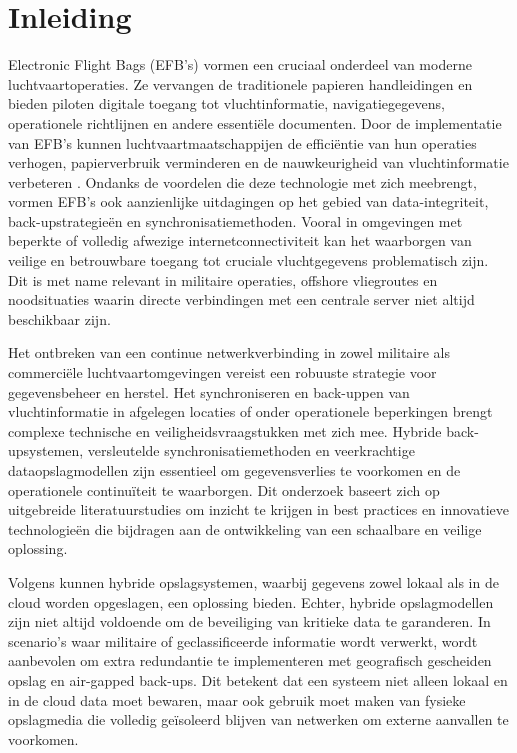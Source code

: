 \section{Inleiding}

Electronic Flight Bags (EFB’s) vormen een cruciaal onderdeel van moderne luchtvaartoperaties. Ze vervangen de traditionele papieren handleidingen en bieden piloten digitale toegang tot vluchtinformatie, navigatiegegevens, operationele richtlijnen en andere essentiële documenten. Door de implementatie van EFB’s kunnen luchtvaartmaatschappijen de efficiëntie van hun operaties verhogen, papierverbruik verminderen en de nauwkeurigheid van vluchtinformatie verbeteren \autocite{IFSAeroEFB, SkybraryEFB}. Ondanks de voordelen die deze technologie met zich meebrengt, vormen EFB’s ook aanzienlijke uitdagingen op het gebied van data-integriteit, back-upstrategieën en synchronisatiemethoden. Vooral in omgevingen met beperkte of volledig afwezige internetconnectiviteit kan het waarborgen van veilige en betrouwbare toegang tot cruciale vluchtgegevens problematisch zijn. Dit is met name relevant in militaire operaties, offshore vliegroutes en noodsituaties waarin directe verbindingen met een centrale server niet altijd beschikbaar zijn.

Het ontbreken van een continue netwerkverbinding in zowel militaire als commerciële luchtvaartomgevingen vereist een robuuste strategie voor gegevensbeheer en herstel. Het synchroniseren en back-uppen van vluchtinformatie in afgelegen locaties of onder operationele beperkingen brengt complexe technische en veiligheidsvraagstukken met zich mee. Hybride back-upsystemen, versleutelde synchronisatiemethoden en veerkrachtige dataopslagmodellen zijn essentieel om gegevensverlies te voorkomen en de operationele continuïteit te waarborgen. Dit onderzoek baseert zich op uitgebreide literatuurstudies om inzicht te krijgen in best practices en innovatieve technologieën die bijdragen aan de ontwikkeling van een schaalbare en veilige oplossing.

Volgens \textcite{Yanamala2024} kunnen hybride opslagsystemen, waarbij gegevens zowel lokaal als in de cloud worden opgeslagen, een oplossing bieden. Echter, hybride opslagmodellen zijn niet altijd voldoende om de beveiliging van kritieke data te garanderen. In scenario’s waar militaire of geclassificeerde informatie wordt verwerkt, wordt aanbevolen om extra redundantie te implementeren met geografisch gescheiden opslag en air-gapped back-ups. Dit betekent dat een systeem niet alleen lokaal en in de cloud data moet bewaren, maar ook gebruik moet maken van fysieke opslagmedia die volledig geïsoleerd blijven van netwerken om externe aanvallen te voorkomen.

